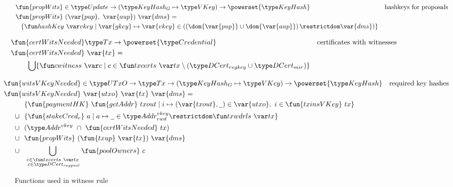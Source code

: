 \begin{figure}[htb]
  \begin{align*}
    & \fun{propWits} \in \Update \to (\KeyHashGen\mapsto\VKey) \to \powerset{\KeyHash}
    & \text{hashkeys for proposals} \\
    & \fun{propWits}~(\var{pup},~\var{aup})~\var{dms} = \\
    & ~~\left\{
      \hashKey{vkey}
      \mid
      \var{gkey}\mapsto\var{vkey}\in
      \left(\left(\dom{\var{pup}}\cup\dom{\var{aup}}\right)\restrictdom\var{dms}\right)
      \right\}
  \end{align*}

  \begin{align*}
    & \hspace{-0.8cm}\fun{certWitsNeeded} \Tx \to \powerset{\Credential}
    & \text{certificates with witnesses} \\
    &  \hspace{-0.8cm}\fun{certWitsNeeded}~\var{tx} = \\
    & \bigcup\{\cwitness{c} \mid c \in \txcerts{tx} \setminus (\DCertRegKey\cup\DCertMir)\}
  \end{align*}

    \begin{align*}
    & \hspace{-0.8cm}\fun{witsVKeyNeeded} \in \UTxO \to \Tx \to (\KeyHashGen\mapsto\VKey) \to
      \powerset{\KeyHash}
    & \text{required key hashes} \\
    &  \hspace{-0.8cm}\fun{witsVKeyNeeded}~\var{utxo}~\var{tx}~\var{dms} = \\
    & ~~\{ \fun{paymentHK}~\fun{getAddr}~{txout} \mid i \mapsto (\var{txout},\wcard) \in \var{utxo},~i\in\fun{txinsVKey}~{tx} \} \\
    \cup & ~~
           \{\fun{stakeCred_r}~a\mid a\mapsto \wcard \in \AddrRWDVKey
      \restrictdom \txwdrls{tx}\}\\
    \cup & ~~(\AddrVKey ~\cap~\fun{certWitsNeeded}~{tx}) \\
    \cup & ~~\fun{propWits}~(\fun{txup}~\var{tx})~\var{dms} \\
    \cup & ~~\bigcup_{\substack{c \in \txcerts{tx} \\ ~c \in\DCertRegPool}} \fun{poolOwners}~{c}
  \end{align*}
  \caption{Functions used in witness rule}
  \label{fig:functions-witnesses}
\end{figure}


